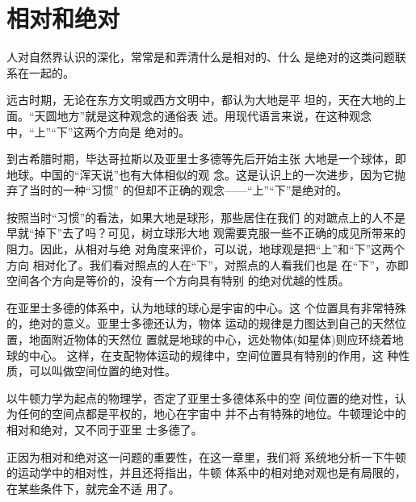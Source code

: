 \section{相对和绝对}

人对自然界认识的深化，常常是和弄清什么是相对的、什么
是绝对的这类问题联系在一起的。

远古时期，无论在东方文明或西方文明中，都认为大地是平
坦的，天在大地的上面。“天圆地方”就是这种观念的通俗表
述。用现代语言来说，在这种观念中，“上”“下”这两个方向是
绝对的。

到古希腊时期，毕达哥拉斯以及亚里士多德等先后开始主张
大地是一个球体，即地球。中国的“浑天说”也有大体相似的观
念。这是认识上的一次进步，因为它抛弃了当时的一种“习惯”
的但却不正确的观念——“上”“下”是绝对的。

按照当时“习惯”的看法，如果大地是球形，那些居住在我们
的对蹠点上的人不是早就“掉下”去了吗？可见，树立球形大地
观需要克服一些不正确的成见所带来的阻力。因此，从相对与绝
对角度来评价，可以说，地球观是把“上”和“下”这两个方向
相对化了。我们看对照点的人在“下”，对照点的人看我们也是
在“下”，亦即空间各个方向是等价的，没有一个方向具有特别
的绝对优越的性质。

在亚里士多德的体系中，认为地球的球心是宇宙的中心。这
个位置具有非常特殊的，绝对的意义。亚里士多德还认为，物体
运动的规律是力图达到自己的天然位置，地面附近物体的天然位
置就是地球的中心，远处物体(如星体)则应环绕着地球的中心。
这样，在支配物体运动的规律中，空间位置具有特别的作用，这
种性质，可以叫做空间位置的绝对性。

以牛顿力学为起点的物理学，否定了亚里士多德体系中的空
间位置的绝对性，认为任何的空间点都是平权的，地心在宇宙中
并不占有特殊的地位。牛顿理论中的相对和绝对，又不同于亚里
士多德了。

正因为相对和绝对这一问题的重要性，在这一章里，我们将
系统地分析一下牛顿的运动学中的相对性，并且还将指出，牛顿
体系中的相对绝对观也是有局限的，在某些条件下，就完金不适
用了。